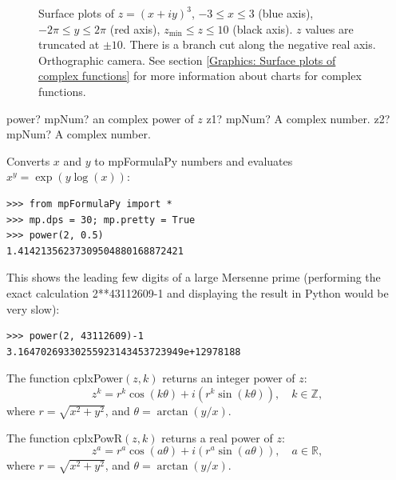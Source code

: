 \begin{figure}[ht]%
	\centering
	\qquad
	\caption[Complex Cube]{Surface plots of $z = (x + iy)^3$, $-3 \leq x \leq 3$ (blue axis), $-2 \pi \leq y \leq 2\pi$ (red axis), $z_{\text{min}} \leq z \leq 10$ (black axis). $z$ values are truncated at $\pm 10$. There is a branch cut along the negative real axis. Orthographic camera. See section \ref{Graphics: Surface plots of complex functions} for more information about charts for complex functions.} 
	\label{fig:Complex Cube}%
\end{figure}




\begin{mpFunctionsExtract}
	\mpFunctionTwo
	{power? mpNum? an complex power of $z$}
	{z1? mpNum? A complex number.}
	{z2? mpNum? A complex number.}
\end{mpFunctionsExtract}


Converts $x$ and $y$ to mpFormulaPy numbers and evaluates $x^y = \exp(y \log(x))$:
\begin{lstlisting}
>>> from mpFormulaPy import *
>>> mp.dps = 30; mp.pretty = True
>>> power(2, 0.5)
1.41421356237309504880168872421
\end{lstlisting}


This shows the leading few digits of a large Mersenne prime (performing the exact
calculation 2**43112609-1 and displaying the result in Python would be very slow):
\begin{lstlisting}
>>> power(2, 43112609)-1
3.16470269330255923143453723949e+12978188
\end{lstlisting}


\vspace{0.3cm}
The function \textsf{cplxPower$(z, k)$} returns an integer power of $z$: 
\begin{equation}
	z^k = r^k \cos(k \theta) + i(r^k \sin(k \theta)), \quad  k \in  \mathbb{Z},
\end{equation}
where $r=\sqrt{x^2+y^2}$, and $\theta=\arctan(y/x)$.



\vspace{0.3cm}
The function \textsf{cplxPowR$(z, k)$} returns a real power of $z$: 
\begin{equation}
	z^a = r^a \cos(a \theta) + i(r^a \sin(a \theta)), \quad  a \in  \mathbb{R},
\end{equation}
where $r=\sqrt{x^2+y^2}$, and $\theta=\arctan(y/x)$.



